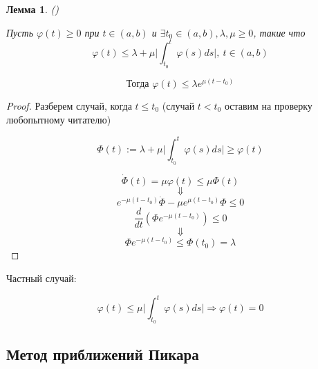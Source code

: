 \documentclass[a4paper]{article}
\theoremstyle{indented}
\newtheorem*{lemma}{Лемма}
\theoremstyle{definition}
\theoremstyle{remark}
\begin{document}
\begin{lemma}
  ()

  Пусть $\varphi(t) \geqslant 0$ при $t \in (a,b)$ и  $\exists t_0 \in (a,b), \lambda, \mu \geqslant 0$, такие что
  \[\varphi (t) \leqslant \lambda + \mu \bigg|\int_{t_0}^{t}\varphi (s) ds \bigg| , \ t \in (a,b)\]

  \[\text{Тогда } \varphi (t) \leqslant \lambda e^{\mu(t - t_0)}\]

\end{lemma}
\begin{proof}
  Разберем случай, когда $t \leqslant t_0$ (случай $t < t_0$ оставим на проверку любопытному читателю)

  \[\Phi(t) := \lambda + \mu \bigg|\int_{t_0}^{t}\varphi (s) ds \bigg| \geqslant \varphi (t)\]

  \[\dot \Phi(t) = \mu \varphi (t) \leqslant \mu \Phi(t)\]
  \[\Downarrow \]
  \[e^{-\mu(t-t_0)} \dot \Phi - \mu e^{\mu(t-t_0)}\Phi \leqslant 0\]
  \[\frac{d}{dt} (\Phi e^{-\mu(t-t_0)}) \leqslant 0 \]
  \[\Downarrow \]
  \[\Phi e^{-\mu(t-t_0)} \leqslant \Phi(t_0) = \lambda\]
  
\end{proof}


Частный случай:

\[\varphi(t) \leqslant  \mu \bigg|\int_{t_0}^{t}\varphi (s) ds \bigg| \Rightarrow \varphi (t) = 0\]

\subsection{Метод приближений Пикара}
\end{document}
